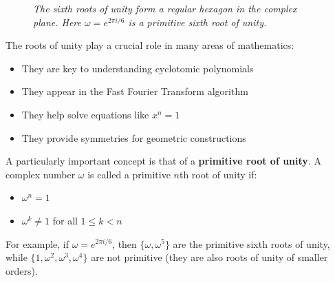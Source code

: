 \begin{figure}[H]
\centering
{}
\caption{\textit{The sixth roots of unity form a regular hexagon in the complex plane. Here $\omega = e^{2\pi i/6}$ is a primitive sixth root of unity.}}
\label{fig:sixth-roots}
\end{figure}

\noindent The roots of unity play a crucial role in many areas of mathematics:
\begin{itemize}
   \item They are key to understanding cyclotomic polynomials
   \item They appear in the Fast Fourier Transform algorithm
   \item They help solve equations like $x^n = 1$
   \item They provide symmetries for geometric constructions
\end{itemize}
\noindent A particularly important concept is that of a \textbf{primitive root of unity}. A complex number $\omega$ is called a primitive $n$th root of unity if:
\begin{itemize}
   \item $\omega^n = 1$
   \item $\omega^k \neq 1$ for all $1 \leq k < n$
\end{itemize}

\noindent For example, if $\omega = e^{2\pi i/6}$, then $\{\omega, \omega^5\}$ are the primitive sixth roots of unity, while $\{1, \omega^2, \omega^3, \omega^4\}$ are not primitive (they are also roots of unity of smaller orders).

